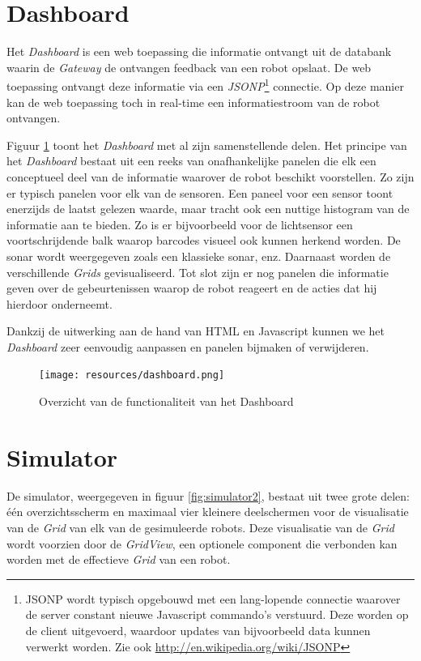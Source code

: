 \documentclass[12pt,a4paper]{report}
\begin{document}
\section{Dashboard}

Het \emph{Dashboard} is een web toepassing die informatie ontvangt uit de databank waarin de \emph{Gateway} de ontvangen feedback van een robot opslaat. De web toepassing ontvangt deze informatie via een \emph{JSONP}\footnote{JSONP wordt typisch opgebouwd met een lang-lopende connectie waarover de server constant nieuwe Javascript commando's verstuurd. Deze worden op de client uitgevoerd, waardoor updates van bijvoorbeeld data kunnen verwerkt worden. Zie ook \url{http://en.wikipedia.org/wiki/JSONP}} connectie. Op deze manier kan de web toepassing toch in real-time een informatiestroom van de robot ontvangen.

Figuur \ref{fig:dashboard_overview} toont het \emph{Dashboard} met al zijn samenstellende delen. Het principe van het \emph{Dashboard} bestaat uit een reeks van onafhankelijke panelen die elk een conceptueel deel van de informatie waarover de robot beschikt voorstellen. Zo zijn er typisch panelen voor elk van de sensoren. Een paneel voor een sensor toont enerzijds de laatst gelezen waarde, maar tracht ook een nuttige histogram van de informatie aan te bieden. Zo is er bijvoorbeeld voor de lichtsensor een voortschrijdende balk waarop barcodes visueel ook kunnen herkend worden. De sonar wordt weergegeven zoals een klassieke sonar, enz. Daarnaast worden de verschillende \emph{Grids} gevisualiseerd. Tot slot zijn er nog panelen die informatie geven over de gebeurtenissen waarop de robot reageert en de acties dat hij hierdoor onderneemt.

Dankzij de uitwerking aan de hand van HTML en Javascript kunnen we het \emph{Dashboard} zeer eenvoudig aanpassen en panelen bijmaken of verwijderen.

\begin{figure}[htbp]
  \centering
  \texttt{[image: resources/dashboard.png]}
  \caption{Overzicht van de functionaliteit van het Dashboard}
  \label{fig:dashboard_overview}
\end{figure}

\section{Simulator}

De simulator, weergegeven in figuur \ref{fig:simulator2}, bestaat uit twee grote delen: \'e\'en overzichtsscherm en maximaal vier kleinere deelschermen voor de visualisatie van de \emph{Grid} van elk van de gesimuleerde robots. Deze visualisatie van de \emph{Grid} wordt voorzien door de \emph{GridView}, een optionele component die verbonden kan worden met de effectieve \emph{Grid} van een robot.
\end{document}
